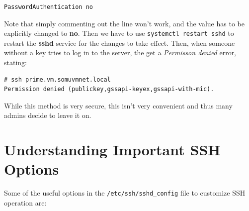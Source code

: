 \vspace{-15pt}
\begin{verbatim}
PasswordAuthentication no
\end{verbatim}
\vspace{-10pt}	

\noindent
Note that simply commenting out the line won't work, and the value has to be explicitly changed to \textbf{no}. Then we have to use \verb|systemctl restart sshd| to restart the \textbf{sshd} service for the changes to take effect. Then, when someone without a key tries to log in to the server, the get a \textit{Permisson denied} error, stating:

\vspace{-15pt}
\begin{verbatim}
# ssh prime.vm.somuvmnet.local
Permission denied (publickey,gssapi-keyex,gssapi-with-mic).
\end{verbatim}
\vspace{-10pt}	

\noindent
While this method is very secure, this isn't very convenient and thus many admins decide to leave it on. 

	\section{Understanding Important SSH Options}
Some of the useful options in the \verb|/etc/ssh/sshd_config| file to customize SSH operation are:

